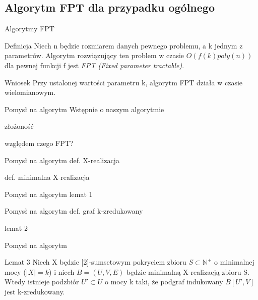 \documentclass{beamer}
\newcommand{\N}{\mathbb{N}}
\begin{document}
	\subsection{Algorytm FPT dla przypadku ogólnego}
		\begin{frame}{Algorytmy FPT}
			\begin{block}{Definicja}			
				Niech n będzie rozmiarem danych pewnego problemu, a k jednym z parametrów. Algorytm rozwiązujący ten problem w czasie $ O(f(k)poly(n)) $ dla pewnej funkcji f jest \emph{FPT (Fixed parameter tractable)}.
			\end{block}
			
			\pause
			\begin{exampleblock}{Wniosek}			
				Przy ustalonej wartości parametru k, algorytm FPT działa w czasie wielomianowym.
			\end{exampleblock}
		\end{frame}
		
		\begin{frame}{Pomysł na algorytm}
			Wstępnie o naszym algorytmie
			
			złożoność
			
			względem czego FPT?
		\end{frame}
		
		\begin{frame}{Pomysł na algorytm}
			def. X-realizacja
			
			def. minimalna X-realizacja
		\end{frame}		
		
		\begin{frame}{Pomysł na algorytm}
			lemat 1
		\end{frame}
		
		\begin{frame}{Pomysł na algorytm}
			def. graf k-zredukowany		
		
			lemat 2
		\end{frame}
		
		\begin{frame}{Pomysł na algorytm}
			\begin{exampleblock}{Lemat 3}			
				Niech X będzie [2]-sumsetowym pokryciem zbioru $ S \subset \N^{+} $ o minimalnej mocy ($ |X| = k $) i niech $ B = (U,V,E) $ będzie minimalną X-realizacją zbioru S. Wtedy istnieje podzbiór $ U' \subset U $ o mocy k taki, że podgraf indukowany $ B[U',V] $ jest k-zredukowany.
			\end{exampleblock}
		\end{frame}
				
\end{document}

